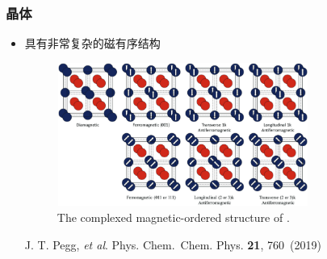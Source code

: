 \documentclass[cjk,slidestop,compress,mathserif,blue]{beamer}
\begin{document}
\frame
{
	\frametitle{\textrm{}晶体}
	\begin{itemize}
		\item \textrm{}具有非常复杂的磁有序结构
\begin{figure}[h!]
\vspace*{-0.08in}
\centering
\includegraphics[height=1.85in,width=3.25in]{Figures/UO2-complex-struct.png}
\caption{\tiny \textrm{The complexed magnetic-ordered structure of .}}%
\label{Fig:Inter-layer-CrI3}
\end{figure}
\textrm{J. T. Pegg, \textit{et al}.  Phys. Chem. Chem. Phys. \textbf{21}, 760~(2019)}
	\end{itemize}
}
\end{document}
